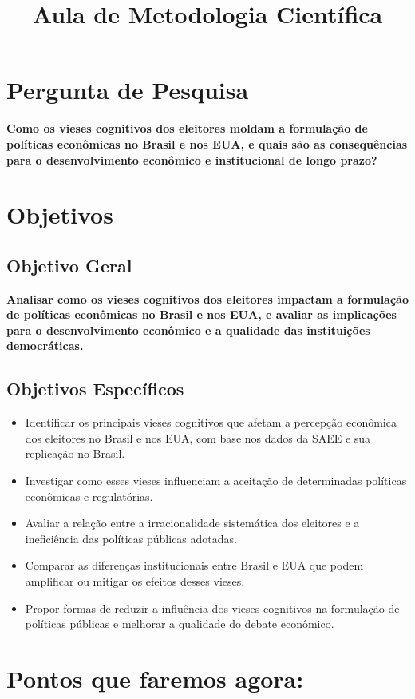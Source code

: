 \documentclass[
	article,
	12pt,
	oneside,
	a4paper,
	english,
	brazil,
	sumario=tradicional
]{abntex2}
\title{Aula de Metodologia Científica}
\begin{document}
\chapter{Pergunta de Pesquisa}



\textbf{Como os vieses cognitivos dos eleitores moldam a formulação de políticas econômicas no Brasil e nos EUA, e quais são as consequências para o desenvolvimento econômico e institucional de longo prazo?}

\newpage
\chapter{Objetivos}

\section{Objetivo Geral}

\textbf{Analisar como os vieses cognitivos dos eleitores impactam a formulação de políticas econômicas no Brasil e nos EUA, e avaliar as implicações para o desenvolvimento econômico e a qualidade das instituições democráticas.}

\section{Objetivos Específicos}

\begin{itemize}
    \item Identificar os principais vieses cognitivos que afetam a percepção econômica dos eleitores no Brasil e nos EUA, com base nos dados da SAEE e sua replicação no Brasil.
    \item Investigar como esses vieses influenciam a aceitação de determinadas políticas econômicas e regulatórias.
    \item Avaliar a relação entre a irracionalidade sistemática dos eleitores e a ineficiência das políticas públicas adotadas.
    \item Comparar as diferenças institucionais entre Brasil e EUA que podem amplificar ou mitigar os efeitos desses vieses.
    \item Propor formas de reduzir a influência dos vieses cognitivos na formulação de políticas públicas e melhorar a qualidade do debate econômico.
\end{itemize}

\newpage
\chapter{Pontos que faremos agora:}
\end{document}
